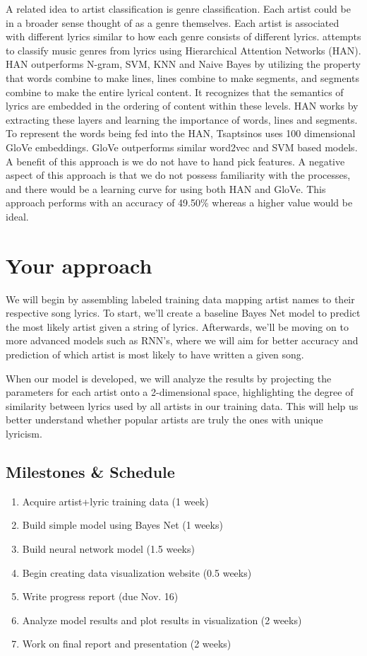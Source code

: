 \documentclass[11pt,a4paper]{article}
\begin{document}
A related idea to artist classification is genre classification. Each artist could be in a broader sense thought of as a genre themselves. Each artist is associated with different lyrics similar to how each genre consists of different lyrics.
  attempts to classify music genres from lyrics using Hierarchical Attention Networks (HAN). 
HAN outperforms N-gram, SVM, KNN and Naive Bayes by utilizing the property that words combine to make lines, lines combine to make segments, and segments combine to make the entire lyrical content.
It recognizes that the semantics of lyrics are embedded in the ordering of content within these levels. 
HAN works by extracting these layers and learning the importance of words, lines and segments. 
To represent the words being fed into the HAN, Tsaptsinos uses 100 dimensional GloVe embeddings. 
GloVe outperforms similar word2vec and SVM based models. 
A benefit of this approach is we do not have to hand pick features.
A negative aspect of this approach is that we do not possess familiarity with the processes, and there would be a learning curve for using both HAN and GloVe. 
This approach performs with an accuracy of 49.50\% whereas a higher value would be ideal. 

\section{Your approach}
We will begin by assembling labeled training data mapping artist names to their respective song lyrics. To start, we'll create a baseline Bayes Net model to predict the most likely artist given a string of lyrics. Afterwards, we'll be moving on to more advanced models such as RNN's, where we will aim for better accuracy and prediction of which artist is most likely to have written a given song. 

When our model is developed, we will analyze the results by projecting the parameters for each artist onto a 2-dimensional space, highlighting the degree of similarity between lyrics used by all artists in our training data. This will help us better understand whether popular artists are truly the ones with unique lyricism.

\subsection{Milestones \& Schedule}


\begin{enumerate}
    \item Acquire artist+lyric training data  (1 week)
    \item Build simple model using Bayes Net (1 weeks)
    \item Build neural network model (1.5 weeks)
    \item Begin creating data visualization website (0.5 weeks)
    \item Write progress report (due Nov. 16)
    \item Analyze model results and plot results in visualization (2 weeks)
    \item Work on final report and presentation (2 weeks)
\end{enumerate}
\end{document}
